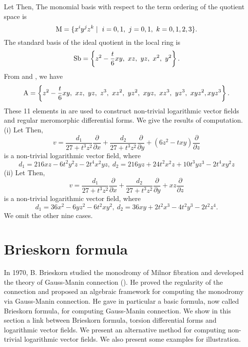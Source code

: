 \documentclass{arxsigma}
\begin{document}
\begin{example}
Let   Then,  The monomial basis   with respect to the term ordering   of the quotient space
  is
\begin{equation*}{\rm M} = \{ x^i y^j z^k \mid \ i=0,1, \ j=0,1, \ k=0,1,2,3 \}.
\end{equation*}
The standard basis of the ideal quotient  
in the local ring   is
\begin{equation*}{\rm Sb} = \left\{ z^2-\dfrac{t}{6}xy, \ xz, \ yz, \ x^2, \ y^2 \right\}.
\end{equation*}
From   and  , we have
\begin{equation*}{\rm A} =\left\{ z^2-\dfrac{t}{6}xy, \ xz, \ yz, \ z^3, \ xz^2, \ yz^2, \ xyz, \ xz^3, \ yz^3, \ xyz^2, xyz^3 \right\}.
\end{equation*}
These 11 elements in   are used to construct non-trivial logarithmic vector fields and regular meromorphic differential forms.
We give the results of computation.\\ \noindent
(i) Let   Then,
\begin{equation*}
v=\frac{d_1}{27+t^3z^2}\frac{\partial}{\partial x} +\frac{d_2}{27+t^3z^2}\frac{\partial}{\partial y} +(6z^2-txy)\frac{\partial}{\partial z}
\end{equation*}
is a non-trivial logarithmic vector field, where
\begin{equation*}
d_1= 216xz-6t^2y^2z-2t^4x^2yz, \ d_2=216yz+24t^2x^2z+10t^3yz^3-2t^4xy^2z
\end{equation*}
\noindent
(ii) Let   Then,
\begin{equation*}
v=\frac{d_1}{27+t^3z^2}\frac{\partial}{\partial x} +\frac{d_2}{27+t^3z^2}\frac{\partial}{\partial y} +xz\frac{\partial}{\partial z}
\end{equation*}
is a non-trivial logarithmic vector field, where
\begin{equation*}
d_1=36x^2-6yz^2-6t^2xy^2, \ d_2=36xy+2t^2x^3-4t^2y^3-2t^2z^4.
\end{equation*}
We omit the other nine cases.
\end{example}
\section{Brieskorn formula}
In 1970, B. Brieskorn studied the monodromy of Milnor fibration and developed the theory of Gauss-Manin connection (\cite{Br}). He proved the regularity of the connection and proposed an algebraic framework
for computing the monodromy via Gauss-Manin connection. He gave in particular a basic formula, now called Brieskorn formula, for computing Gauss-Manin connection.
We show in this section a link between Brieskorn formula, torsion differential forms and logarithmic vector fields. We present an alternative method for computing non-trivial logarithmic vector fields. We also present some examples for illustration.
\end{document}
